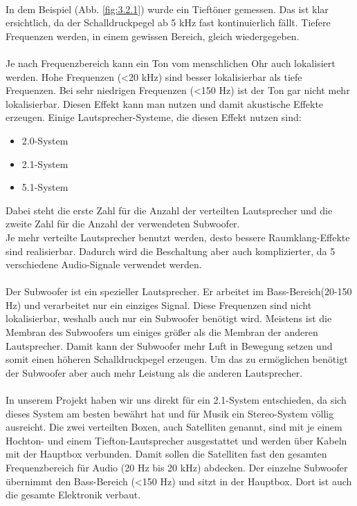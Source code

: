 \\
In dem Beispiel (Abb. \ref{fig:3.2.1}) wurde ein Tieftöner gemessen.
Das ist klar ersichtlich, da der Schalldruckpegel ab 5 kHz fast kontinuierlich fällt.
Tiefere Frequenzen werden, in einem gewissen Bereich, gleich wiedergegeben.
\\ \\
Je nach Frequenzbereich kann ein Ton vom menschlichen Ohr auch lokalisiert \mbox{werden}.
Hohe Frequenzen (<20 kHz) sind besser lokalisierbar als tiefe Frequenzen.
Bei sehr niedrigen Frequenzen (<150 Hz) ist der Ton gar nicht mehr lokalisierbar.
Diesen \mbox{Effekt} kann man nutzen und damit akustische Effekte erzeugen.
Einige Lautsprecher-Systeme, die diesen Effekt nutzen sind:
\begin{itemize}
	\item 2.0-System
	\item 2.1-System
	\item 5.1-System
\end{itemize}
Dabei steht die erste Zahl für die Anzahl der verteilten Lautsprecher und die zweite Zahl für die Anzahl der verwendeten Subwoofer.
\\
Je mehr verteilte Lautsprecher benutzt werden, desto bessere Raumklang-Effekte sind realisierbar.
Dadurch wird die Beschaltung aber auch komplizierter, da 5 verschiedene Audio-Signale verwendet werden.
\\ \\
Der Subwoofer ist ein spezieller Lautsprecher.
Er arbeitet im Bass-Bereich(20-150 Hz) und verarbeitet nur ein einziges Signal.
Diese Frequenzen sind nicht lokalisierbar, weshalb auch nur ein Subwoofer benötigt wird.
Meistens ist die Membran des Subwoofers um einiges größer als die Membran der anderen Lautsprecher.
Damit kann der Subwoofer mehr Luft in Bewegung setzen und somit einen höheren Schalldruckpegel erzeugen.
Um das zu ermöglichen benötigt der Subwoofer aber auch mehr Leistung als die anderen Lautsprecher.
\\ \\
In unserem Projekt haben wir uns direkt für ein 2.1-System entschieden, da sich dieses System am besten bewährt hat und für Musik ein Stereo-System völlig ausreicht.
Die zwei verteilten Boxen, auch Satelliten genannt, sind mit je einem Hochton- und einem Tiefton-Lautsprecher ausgestattet und werden über Kabeln mit der Hauptbox verbunden.
Damit sollen die Satelliten fast den gesamten Frequenzbereich für Audio (20 Hz bis 20 kHz) abdecken.
Der einzelne Subwoofer übernimmt den Bass-Bereich (<150 Hz) und sitzt in der Hauptbox.
Dort ist auch die gesamte Elektronik verbaut.

